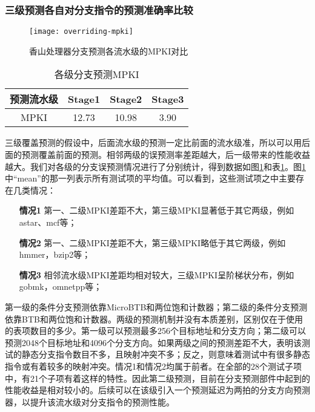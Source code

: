 \subsubsection*{三级预测各自对分支指令的预测准确率比较}
\begin{figure}[!htbp]
    \centering
    \texttt{[image: overriding-mpki]}
    \caption{香山处理器分支预测各流水级的MPKI对比}
    \label{fig:overriding-mpki}
\end{figure}
\begin{table}[!htbp]
    \centering
    \footnotesize%
    \setlength{\tabcolsep}{4pt}%
    \renewcommand{\arraystretch}{1.2}%
    \begin{tabular}{cccc}
        \hline
        预测流水级 & Stage1 & Stage2 & Stage3 \\
        \hline
        MPKI      & 12.73  & 10.98  & 3.90 \\
        \hline
    \end{tabular}
    \caption{各级分支预测MPKI}
    \label{tab:overriding}
\end{table}
三级覆盖预测的假设中，后面流水级的预测一定比前面的流水级准，所以可以用后面的预测覆盖前面的预测。相邻两级的误预测率差距越大，后一级带来的性能收益越大。我们对各级的分支误预测情况进行了分别统计，得到数据如图\ref{fig:overriding-mpki}和表\ref{tab:overriding}。图\ref{fig:overriding-mpki}中“mean”的那一列表示所有测试项的平均值。可以看到，这些测试项之中主要存在几类情况：
\begin{enumerate}
    \item[\textbf{情况1}] 第一、二级MPKI差距不大，第三级MPKI显著低于其它两级，例如astar、mcf等；\label{overriding:cond1}
    \item[\textbf{情况2}] 第一、二级MPKI差距不大，第三级MPKI略低于其它两级，例如hmmer，bzip2等；\label{overriding:cond2}
    \item[\textbf{情况3}] 相邻流水级MPKI差距均相对较大，三级MPKI呈阶梯状分布，例如gobmk，omnetpp等；\label{overriding:cond3}
\end{enumerate}

第一级的条件分支预测依靠MicroBTB和两位饱和计数器；第二级的条件分支预测依靠BTB和两位饱和计数器。两级的预测机制并没有本质差别，区别仅在于使用的表项数目的多少。第一级可以预测最多256个目标地址和分支方向；第二级可以预测2048个目标地址和4096个分支方向。如果两级之间的预测差距不大，表明该测试的静态分支指令数目不多，且映射冲突不多；反之，则意味着测试中有很多静态指令或有着较多的映射冲突。情况1和情况2均属于前者。在全部的28个测试子项中，有21个子项有着这样的特性。因此第二级预测，目前在分支预测部件中起到的性能收益是相对较小的。后续可以在该级引入一个预测延迟为两拍的分支方向预测器，以提升该流水级对分支指令的预测性能。

